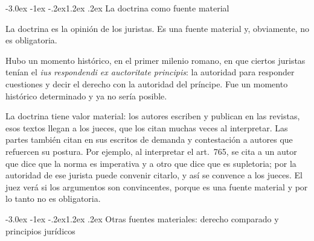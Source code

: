 \documentclass[12pt,oneside]{book}
\makeatletter
\renewcommand\section{\@startsection{section}{1}{\z@}%
  {-3.0ex \@plus -1ex \@minus -.2ex}{1.2ex \@plus .2ex}%
  {\normalfont\large\bfseries\color{acento}}}
\makeatother
\begin{document}
\section{La doctrina como fuente material}

La doctrina es la opinión de los juristas. Es una fuente material y, obviamente, no es obligatoria.

Hubo un momento histórico, en el primer milenio romano, en que ciertos juristas tenían el \textit{ius respondendi ex auctoritate principis}: la autoridad para responder cuestiones y decir el derecho con la autoridad del príncipe. Fue un momento histórico determinado y ya no sería posible.

La doctrina tiene valor material: los autores escriben y publican en las revistas, esos textos llegan a los jueces, que los citan muchas veces al interpretar. Las partes también citan en sus escritos de demanda y contestación a autores que refuercen su postura. Por ejemplo, al interpretar el art.~765, se cita a un autor que dice que la norma es imperativa y a otro que dice que es supletoria; por la autoridad de ese jurista puede convenir citarlo, y así se convence a los jueces. El juez verá si los argumentos son convincentes, porque es una fuente material y por lo tanto no es obligatoria.

\section{Otras fuentes materiales: derecho comparado y principios jurídicos}
\end{document}
